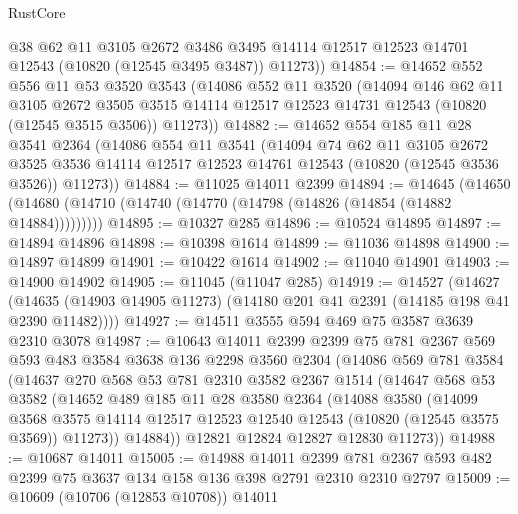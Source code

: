 \begin{lexlean}{RustCore}
\begin{coremodule}
        @38
        @62
        @11
        @3105
        @2672
        @3486
        @3495
        @14114
        @12517
        @12523
        @14701
        @12543
        (@10820 (@12545 @3495 @3487))
        @11273))
@14854 := @14652
    @552
    @556
    @11
    @53
    @3520
    @3543
    (@14086
      @552
      @11
      @3520
      (@14094
        @146
        @62
        @11
        @3105
        @2672
        @3505
        @3515
        @14114
        @12517
        @12523
        @14731
        @12543
        (@10820 (@12545 @3515 @3506))
        @11273))
@14882 := @14652
    @554
    @185
    @11
    @28
    @3541
    @2364
    (@14086
      @554
      @11
      @3541
      (@14094
        @74
        @62
        @11
        @3105
        @2672
        @3525
        @3536
        @14114
        @12517
        @12523
        @14761
        @12543
        (@10820 (@12545 @3536 @3526))
        @11273))
@14884 := @11025 @14011 @2399
@14894 := @14645
    (@14650 (@14680 (@14710 (@14740 (@14770 (@14798 (@14826 (@14854 (@14882 @14884)))))))))
@14895 := @10327 @285
@14896 := @10524 @14895
@14897 := @14894 @14896
@14898 := @10398 @1614
@14899 := @11036 @14898
@14900 := @14897 @14899
@14901 := @10422 @1614
@14902 := @11040 @14901
@14903 := @14900 @14902
@14905 := @11045 (@11047 @285)
@14919 := @14527
    (@14627 (@14635 (@14903 @14905 @11273) (@14180 @201 @41 @2391 (@14185 @198 @41 @2390 @11482))))
@14927 := @14511 @3555 @594 @469 @75 @3587 @3639 @2310 @3078
@14987 := @10643
    @14011
    @2399
    @2399
    @75
    @781
    @2367
    @569
    @593
    @483
    @3584
    @3638
    @136
    @2298
    @3560
    @2304
    (@14086
      @569
      @781
      @3584
      (@14637
        @270
        @568
        @53
        @781
        @2310
        @3582
        @2367
        @1514
        (@14647
          @568
          @53
          @3582
          (@14652
            @489
            @185
            @11
            @28
            @3580
            @2364
            (@14088
              @3580
              (@14099
                @3568
                @3575
                @14114
                @12517
                @12523
                @12540
                @12543
                (@10820 (@12545 @3575 @3569))
                @11273))
            @14884))
        @12821
        @12824
        @12827
        @12830
        @11273))
@14988 := @10687 @14011
@15005 := @14988
    @14011
    @2399
    @781
    @2367
    @593
    @482
    @2399
    @75
    @3637
    @134
    @158
    @136
    @398
    @2791
    @2310
    @2310
    @2797
@15009 := @10609 (@10706 (@12853 @10708)) @14011

\end{coremodule}
\end{lexlean}

